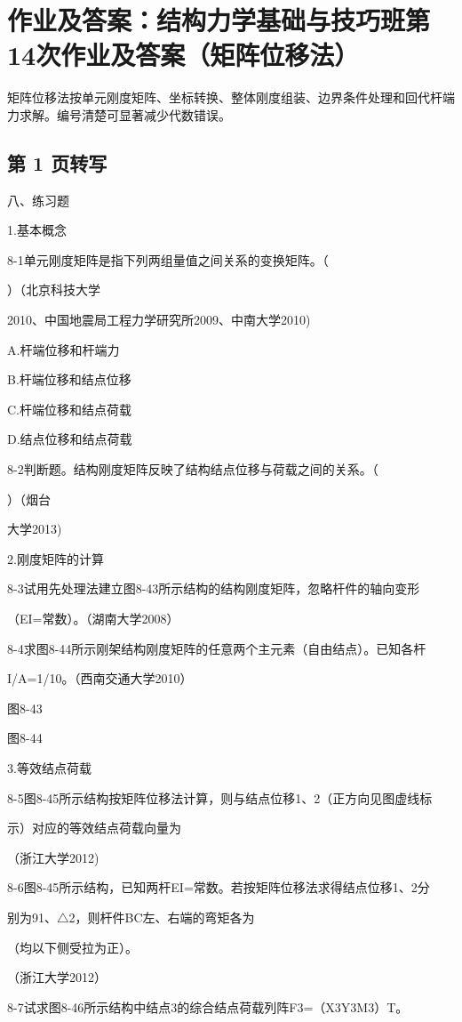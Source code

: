 \section{作业及答案：结构力学基础与技巧班第14次作业及答案（矩阵位移法）}
\begin{analysisbox}
矩阵位移法按单元刚度矩阵、坐标转换、整体刚度组装、边界条件处理和回代杆端力求解。编号清楚可显著减少代数错误。
\end{analysisbox}
\subsection*{第 1 页转写}
八、练习题

1.基本概念

8-1单元刚度矩阵是指下列两组量值之间关系的变换矩阵。（

）（北京科技大学

2010、中国地震局工程力学研究所2009、中南大学2010)

A.杆端位移和杆端力

B.杆端位移和结点位移

C.杆端位移和结点荷载

D.结点位移和结点荷载

8-2判断题。结构刚度矩阵反映了结构结点位移与荷载之间的关系。（

）（烟台

大学2013)

2.刚度矩阵的计算

8-3试用先处理法建立图8-43所示结构的结构刚度矩阵，忽略杆件的轴向变形

（EI=常数）。（湖南大学2008）

8-4求图8-44所示刚架结构刚度矩阵的任意两个主元素（自由结点）。已知各杆

I/A=1/10。（西南交通大学2010）

图8-43

图8-44

3.等效结点荷载

8-5图8-45所示结构按矩阵位移法计算，则与结点位移1、2（正方向见图虚线标

示）对应的等效结点荷载向量为

（浙江大学2012)

8-6图8-45所示结构，已知两杆EI=常数。若按矩阵位移法求得结点位移1、2分

别为91、$\triangle$2，则杆件BC左、右端的弯矩各为

（均以下侧受拉为正）。

（浙江大学2012）

8-7试求图8-46所示结构中结点3的综合结点荷载列阵F3=（X3Y3M3）T。

